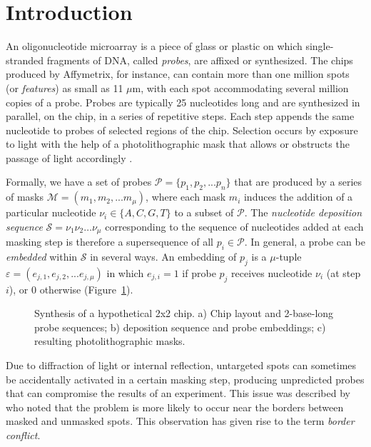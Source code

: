 \documentclass{bioinfo}
\begin{document}
\section{Introduction}

An oligonucleotide microarray is a piece of glass or plastic on which single-stranded fragments of DNA, called \emph{probes}, are affixed or synthesized. The chips produced by Affymetrix, for instance, can contain more than one million spots (or \emph{features}) as small as 11 $\mu$m, with each spot accommodating several million copies of a probe. Probes are typically 25 nucleotides long and are synthesized in parallel, on the chip, in a series of repetitive steps. Each step appends the same nucleotide to probes of selected regions of the chip. Selection occurs by exposure to light with the help of a photolithographic mask that allows or obstructs the passage of light accordingly \citep{FODOR91}.

Formally, we have a set of probes $\mathcal{P} = \{p_{1}, p_{2}, ... p_{n}\}$ that are produced by a series of masks $\mathcal{M} = (m_{1}, m_{2}, ... m_{\mu})$, where each mask $m_{i}$ induces the addition of a particular nucleotide $\nu_{i} \in \{A, C, G, T\}$ to a subset of $\mathcal{P}$. The \emph{nucleotide deposition sequence} $\mathcal{S} = \nu_{1} \nu_{2} \ldots \nu_{\mu}$ corresponding to the sequence of nucleotides added at each masking step is therefore a supersequence of all $p_{i} \in \mathcal{P}$. In general, a probe can be \emph{embedded} within $\mathcal{S}$ in several ways. An embedding of $p_{j}$ is a $\mu$-tuple $\varepsilon = (e_{j,1}, e_{j,2}, ... e_{j,\mu})$ in which $e_{j,i} = 1$ if probe $p_{j}$ receives nucleotide $\nu_{i}$ (at step $i$), or 0 otherwise (Figure~\ref{fig:01}).

\begin{figure}
\caption{Synthesis of a hypothetical 2x2 chip. a) Chip layout and 2-base-long probe sequences; b) deposition sequence and probe embeddings; c) resulting photolithographic masks.}\label{fig:01}
\end{figure}

Due to diffraction of light or internal reflection, untargeted spots can sometimes be accidentally activated in a certain masking step, producing unpredicted probes that can compromise the results of an experiment. This issue was described by \citealp{FODOR91} who noted that the problem is more likely to occur near the borders between masked and unmasked spots. This observation has given rise to the term \emph{border conflict}.
\end{document}

